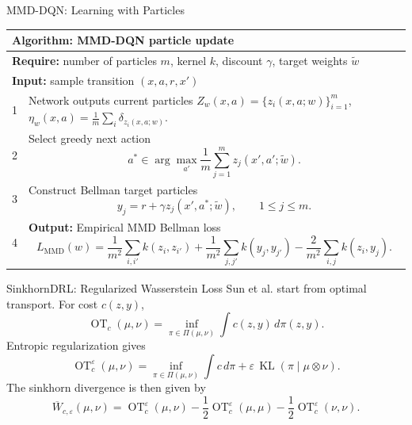 \documentclass[10pt]{beamer}
\newcommand{\1}{\mathds{1}}
\begin{document}
\begin{frame}{MMD-DQN: Learning with Particles}
  \small
  \setlength{\tabcolsep}{0.35em}
  \begin{center}
  \begin{tabular}{p{}p{}}
    \hline
    \multicolumn{2}{l}{\textbf{Algorithm: MMD-DQN particle update}}\\
    \hline
    \multicolumn{2}{l}{\textbf{Require:} number of particles $m$, kernel $k$,
      discount $\gamma$, target weights $\widetilde w$}\\
    \multicolumn{2}{l}{\textbf{Input:} sample transition $(x,a,r,x')$}\\[0.2em]
    1 & Network outputs current particles
      $Z_w(x,a)=\{z_i(x,a;w)\}_{i=1}^m$,
      $\eta_w(x,a)=\frac1m\sum_i\delta_{z_i(x,a;w)}$.\\[0.3em]
    2 & Select greedy next action
      \[
        a^*\in\arg\max_{a'}\frac1m\sum_{j=1}^m
        z_j(x',a';\widetilde w).
      \]\\[-0.4em]
    3 & Construct Bellman target particles
      \[
        y_j=r+\gamma z_j(x',a^*;\widetilde w),
        \qquad 1\leq j\leq m.
      \]\\[-0.4em]
    4 & \textbf{Output:} Empirical MMD Bellman loss
      \[
        L_{\operatorname{MMD}}(w)
        =
        \frac1{m^2}\sum_{i,i'}k(z_i,z_{i'})
        +
        \frac1{m^2}\sum_{j,j'}k(y_j,y_{j'})
        -
        \frac2{m^2}\sum_{i,j}k(z_i,y_j).
      \]\\[-0.4em]
    \hline
  \end{tabular}
  \end{center}
\end{frame}

\begin{frame}{SinkhornDRL: Regularized Wasserstein Loss}
  \small
  Sun et al. start from optimal transport. For cost $c(z,y)$,
  \[
    \operatorname{OT}_c(\mu,\nu)
    =
    \inf_{\pi\in\Pi(\mu,\nu)}
    \int c(z,y)\,d\pi(z,y).
  \]
  Entropic regularization gives
  \[
    \operatorname{OT}^{\varepsilon}_c(\mu,\nu)
    =
    \inf_{\pi\in\Pi(\mu,\nu)}
    \int c\,d\pi
    +
    \varepsilon\,\operatorname{KL}(\pi\mid\mu\otimes\nu).
  \]
  The sinkhorn divergence is then given by 
  \[
    \overline W_{c,\varepsilon}(\mu,\nu)
    =
    \operatorname{OT}^{\varepsilon}_c(\mu,\nu)
    -\frac12\operatorname{OT}^{\varepsilon}_c(\mu,\mu)
    -\frac12\operatorname{OT}^{\varepsilon}_c(\nu,\nu).
  \]
\end{frame}
\end{document}
